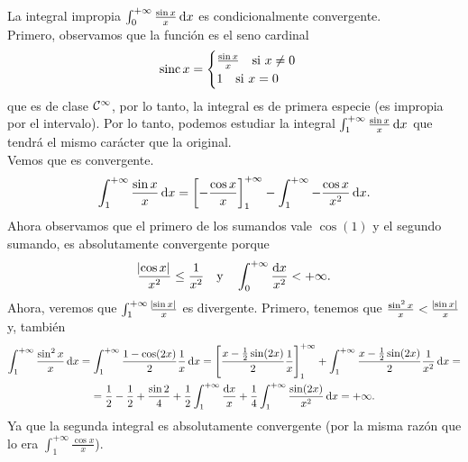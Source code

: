 \begin{example*}
    La integral impropia $\int^{+\infty}_0 \frac{\sin x}{x} \dif x$ es
    condicionalmente convergente. \\
    Primero, observamos que la función es el seno cardinal
    \[
        \operatorname{sinc} x = \begin{cases} \frac{\sin x}{x} \quad \text{si } x \neq 0 \\
            1 \quad \text{si } x = 0 \end{cases}
    \]
    que es de clase $\mathcal{C}^{\infty}$, por lo tanto, la integral es de primera especie
    (es impropia por el intervalo). Por lo tanto, podemos estudiar la integral
    $\int^{+\infty}_1 \frac{\sin x}{x} \dif x$ que tendrá el mismo carácter que
    la original. \\
    Vemos que es convergente.
    \[
        \int^{+\infty}_1 \frac{\sin x}{x}\dif x =
        \left[-\frac{\cos x}{x}\right]^{+\infty}_1 - \int^{+\infty}_1 
        -\frac{\cos x}{x^2} \dif x.
    \]
    Ahora observamos que el primero de los sumandos vale $\cos(1)$ y el segundo
    sumando, es absolutamente convergente porque
    \[
        \frac{\abs{\cos x}}{x^2} \leq \frac{1}{x^2} \quad \text{y} \quad
        \int^{+\infty}_0 \frac{\dif x}{x^2} < +\infty.
    \]
    Ahora, veremos que $\int^{+\infty}_1 \frac{\abs{\sin x}}{x}$ es divergente.
    Primero, tenemos que $\frac{\sin^2 x}{x} < \frac{\abs{\sin x}}{x}$ y, tambi\'en
    \begin{gather*}
        \int^{+\infty}_1 \frac{\sin^2 x}{x} \dif x = \int^{+\infty}_1
        \frac{1 - \cos(2x)}{2} \frac{1}{x} \dif x = 
        \left[ \frac{x - \frac{1}{2}\sin(2x)}{2}\frac{1}{x} \right]^{+\infty}_1
        + \int^{+\infty}_1 \frac{x -\frac{1}{2}\sin(2x)}{2}\frac{1}{x^2}\dif x=
        \\ = \frac{1}{2} - \frac{1}{2} + \frac{\sin 2}{4} +
        \frac{1}{2}\int^{+\infty}_{1} \frac{\dif x}{x} + \frac{1}{4}
        \int^{+\infty}_1 \frac{\sin(2x)}{x^2} \dif x = +\infty.
    \end{gather*}
    Ya que la segunda integral es absolutamente convergente (por la misma razón que
    lo era $\int^{+\infty}_1 \frac{\cos x}{x}$).
\end{example*}
